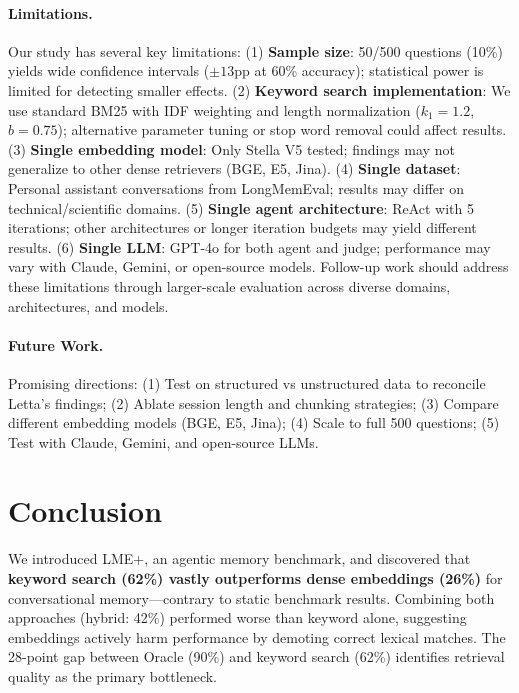 \documentclass{article}
\begin{document}
\paragraph{Limitations.}
Our study has several key limitations: (1) \textbf{Sample size}: 50/500 questions (10\%) yields wide confidence intervals ($\pm 13$pp at 60\% accuracy); statistical power is limited for detecting smaller effects. (2) \textbf{Keyword search implementation}: We use standard BM25 with IDF weighting and length normalization ($k_1=1.2$, $b=0.75$); alternative parameter tuning or stop word removal could affect results. (3) \textbf{Single embedding model}: Only Stella V5 tested; findings may not generalize to other dense retrievers (BGE, E5, Jina). (4) \textbf{Single dataset}: Personal assistant conversations from LongMemEval; results may differ on technical/scientific domains. (5) \textbf{Single agent architecture}: ReAct with 5 iterations; other architectures or longer iteration budgets may yield different results. (6) \textbf{Single LLM}: GPT-4o for both agent and judge; performance may vary with Claude, Gemini, or open-source models. Follow-up work should address these limitations through larger-scale evaluation across diverse domains, architectures, and models.

\paragraph{Future Work.}
Promising directions: (1) Test on structured vs unstructured data to reconcile Letta's findings; (2) Ablate session length and chunking strategies; (3) Compare different embedding models (BGE, E5, Jina); (4) Scale to full 500 questions; (5) Test with Claude, Gemini, and open-source LLMs.

\section{Conclusion}
\label{sec:conclusion}

We introduced LME+, an agentic memory benchmark, and discovered that \textbf{keyword search (62\%) vastly outperforms dense embeddings (26\%)} for conversational memory---contrary to static benchmark results. Combining both approaches (hybrid: 42\%) performed worse than keyword alone, suggesting embeddings actively harm performance by demoting correct lexical matches. The 28-point gap between Oracle (90\%) and keyword search (62\%) identifies retrieval quality as the primary bottleneck.
\end{document}
